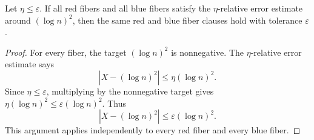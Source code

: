 \begin{helper}
Let \(\eta\le\varepsilon\).  If all red fibers and all blue fibers satisfy
the \(\eta\)-relative error estimate around \((\log n)^2\), then the same red
and blue fiber clauses hold with tolerance \(\varepsilon\).
\end{helper}
\begin{proof}
For every fiber, the target \((\log n)^2\) is nonnegative.  The
\(\eta\)-relative error estimate says
\[
|X-(\log n)^2|\le \eta(\log n)^2.
\]
Since \(\eta\le\varepsilon\), multiplying by the nonnegative target gives
\(\eta(\log n)^2\le\varepsilon(\log n)^2\).  Thus
\[
|X-(\log n)^2|\le\varepsilon(\log n)^2.
\]
This argument applies independently to every red fiber and every blue fiber.
\end{proof}
